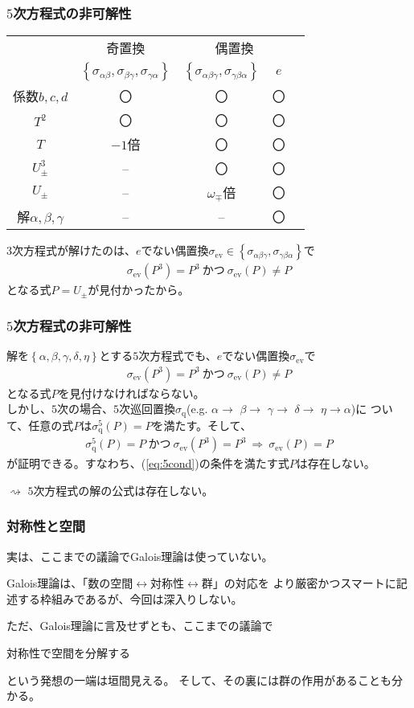 \documentclass[12pt, t]{beamer}
\newcommand{\clr}[1]{\left\{{}#1\right\}{}}
\begin{document}
\begin{frame}
\frametitle{$5$次方程式の非可解性}
\begin{tabular}{c|cccc}
       &奇置換                                & \multicolumn{2}{|c}{偶置換} \\
       &$\clr{\sigma_{\alpha \beta},\sigma_{\beta \gamma},\sigma_{\gamma \alpha}}$ & \multicolumn{1}{|c}{$\clr{\sigma_{\alpha \beta \gamma}, \sigma_{\gamma \beta \alpha}}$} & $e$ \\ \hline
  係数$b,c,d$&〇&〇&〇 \\
  $T^2$&〇&〇&〇 \\
  $T$  &$-1$倍&〇&〇 \\
  $U_{\pm}^3$ &--&〇&〇 \\
  $U_{\pm}$   &--&$\omega_{\mp}$倍&〇 \\
  解$\alpha, \beta,\gamma$ &--&--&〇
\end{tabular}

$3$次方程式が解けたのは、$e$でない偶置換$\sigma_\mathrm{ev} \in \clr{\sigma_{\alpha \beta \gamma}, \sigma_{\gamma \beta \alpha}}$で
\begin{align}
  \sigma_\mathrm{ev}(P^3) = P^3 \ \text{かつ} \ \sigma_\mathrm{ev}(P) \neq P
\end{align}
となる式$P = U_\pm$が見付かったから。
\end{frame}

\begin{frame}
\frametitle{$5$次方程式の非可解性}
解を$\clr{\alpha, \beta, \gamma, \delta, \eta}$とする$5$次方程式でも、$e$でない偶置換$\sigma_\mathrm{ev}$で
\begin{align}
  \sigma_\mathrm{ev}(P^3) = P^3 \ \text{かつ} \ \sigma_\mathrm{ev}(P) \neq P \label{eq:5cond}
\end{align}
となる式$P$を見付けなければならない。\\
しかし、$5$次の場合、$5$次巡回置換$\sigma_\mathrm{q}$(e.g. $\alpha \to$ $\beta \to$ $\gamma \to$ $\delta \to$ $\eta \to \alpha$)に
ついて、任意の式$P$は$\sigma_{\mathrm{q}}^5(P) = P$を満たす。そして、
\begin{align}
  \sigma_{\mathrm{q}}^5(P) = P \ \text{かつ} \ \sigma_\mathrm{ev}(P^3) = P^3 \ \Rightarrow \ \sigma_\mathrm{ev}(P) = P
\end{align}
が証明できる。すなわち、(\ref{eq:5cond})の条件を満たす式$P$は存在しない。

$\rightsquigarrow$ $5$次方程式の解の公式は存在しない。
\end{frame}

\begin{frame}
\frametitle{対称性と空間}
実は、ここまでの議論でGalois理論は\alert{使っていない}。

Galois理論は、「数の空間$\leftrightarrow$対称性$\leftrightarrow$群」の対応を
より厳密かつスマートに記述する枠組みであるが、今回は深入りしない。

ただ、Galois理論に言及せずとも、ここまでの議論で
\begin{center}
対称性で空間を分解する
\end{center}
という発想の一端は垣間見える。
そして、その裏には群の作用があることも分かる。
\end{frame}
\end{document}
